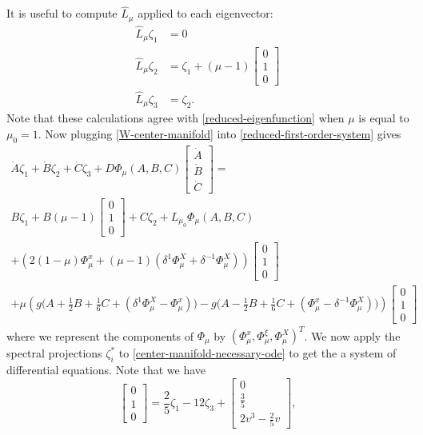 It is useful to compute \(\widehat L_\mu\) applied to each eigenvector:
\begin{align*}
	\widehat L_\mu \zeta_1 &= 0 \\
	\widehat L_\mu \zeta_2 &= \zeta _1  + (\mu-1)\begin{bmatrix}0 \\ 1 \\ 0 \end{bmatrix} \\
	\widehat L_\mu \zeta_3 &= \zeta_2.
\end{align*}
Note that these calculations agree with \cref{reduced-eigenfunction} when \(\mu\) is equal to \(\mu_0 = 1\). Now plugging \cref{W-center-manifold} into \cref{reduced-first-order-system} gives
\begin{multline}\label{center-manifold-necessary-ode}
	\dot A \zeta_1 + \dot B \zeta_2 + \dot C \zeta_3 + D\Phi_\mu(A,B,C) \begin{bmatrix} \dot A \\ \dot B \\ \dot C \end{bmatrix} = \\
	B \zeta_1 + B(\mu-1) \begin{bmatrix}0 \\ 1 \\ 0 \end{bmatrix} + C \zeta_2 + L_{\mu_0} \Phi_\mu(A,B,C) \\
	+ \left(2(1-\mu) \Phi_\mu^x + (\mu-1)(\delta^1 \Phi_\mu^X + \delta^{-1} \Phi_\mu^X)\right) \begin{bmatrix}0 \\ 1 \\ 0 \end{bmatrix} \\
	+ \mu\left( g\big(A + \frac 1 2 B + \frac 1 6 C + (\delta^1 \Phi_\mu^X -\Phi_\mu^x)\big) - g\big(A - \frac 1 2 B + \frac 1 6 C + (\Phi_\mu^x - \delta^{-1} \Phi_\mu^X)\big) \right) \begin{bmatrix}0 \\ 1 \\ 0 \end{bmatrix}
\end{multline}
where we represent the components of \(\Phi_\mu\) by \((\Phi_\mu^x, \Phi_\mu^\xi, \Phi_\mu^X)^T\). We now apply the spectral projections \(\zeta_i^*\) to \cref{center-manifold-necessary-ode} to get the a system of differential equations. Note that we have 
\begin{equation*}
	\begin{bmatrix}
		0 \\ 1 \\ 0 
	\end{bmatrix} = \frac 25 \zeta_1 - 12 \zeta_3 + \begin{bmatrix}
	0 \\ \frac 3 5 \\ 2v^3 - \frac 2 5 v
\end{bmatrix},
\end{equation*}
